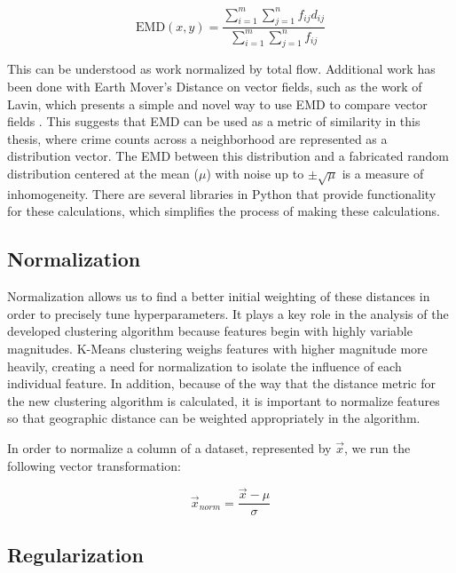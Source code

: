 \documentclass[times new roman,12pt]{article}
\begin{document}
\vspace{3mm}
$$\textrm{EMD}(x,y) = \frac{\sum_{i=1}^m \sum_{j=1}^n f_{ij}d_{ij}}{\sum_{i=1}^m \sum_{j=1}^n f_{ij}}$$\vspace{3mm}

This can be understood as work normalized by total flow. Additional work has been done with Earth Mover's Distance on vector fields, such as the work of Lavin, which presents a simple and novel way to use EMD to compare vector fields \cite{yingmei_lavin_feature_nodate}. This suggests that EMD can be used as a metric of similarity in this thesis, where crime counts across a neighborhood are represented as a distribution vector. The EMD between this distribution and a fabricated random distribution centered at the mean ($\mu$) with noise up to  $\pm \sqrt{\mu}$  is a measure of inhomogeneity. There are several libraries in Python that provide functionality for these calculations, which simplifies the process of making these calculations. 

\subsection{Normalization}

Normalization allows us to find a better initial weighting of these distances in order to precisely tune hyperparameters. It plays a key role in the analysis of the developed clustering algorithm because features begin with highly variable magnitudes. K-Means clustering weighs features with higher magnitude more heavily, creating a need for normalization to isolate the influence of each individual feature. In addition, because of the way that the distance metric for the new clustering algorithm is calculated, it is important to normalize features so that geographic distance can be weighted appropriately in the algorithm.

In order to normalize a column of a dataset, represented by $\vec{x}$, we run the following vector transformation:

$$\vec{x}_{norm} = \frac{\vec{x}-\mu}{\sigma}$$


\subsection{Regularization}
\end{document}
